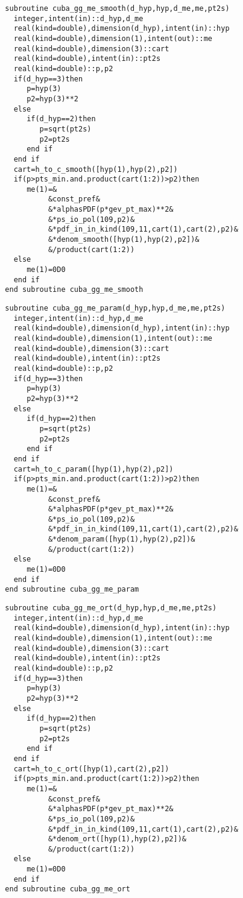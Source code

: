 \begin{Verbatim}
  subroutine cuba_gg_me_smooth(d_hyp,hyp,d_me,me,pt2s)
    integer,intent(in)::d_hyp,d_me
    real(kind=double),dimension(d_hyp),intent(in)::hyp
    real(kind=double),dimension(1),intent(out)::me
    real(kind=double),dimension(3)::cart
    real(kind=double),intent(in)::pt2s
    real(kind=double)::p,p2
    if(d_hyp==3)then
       p=hyp(3)
       p2=hyp(3)**2
    else
       if(d_hyp==2)then
          p=sqrt(pt2s)
          p2=pt2s
       end if
    end if
    cart=h_to_c_smooth([hyp(1),hyp(2),p2])
    if(p>pts_min.and.product(cart(1:2))>p2)then
       me(1)=&
            &const_pref&
            &*alphasPDF(p*gev_pt_max)**2&
            &*ps_io_pol(109,p2)&
            &*pdf_in_in_kind(109,11,cart(1),cart(2),p2)&
            &*denom_smooth([hyp(1),hyp(2),p2])&
            &/product(cart(1:2))
    else
       me(1)=0D0
    end if
  end subroutine cuba_gg_me_smooth
\end{Verbatim}

\begin{Verbatim}
  subroutine cuba_gg_me_param(d_hyp,hyp,d_me,me,pt2s)
    integer,intent(in)::d_hyp,d_me
    real(kind=double),dimension(d_hyp),intent(in)::hyp
    real(kind=double),dimension(1),intent(out)::me
    real(kind=double),dimension(3)::cart
    real(kind=double),intent(in)::pt2s
    real(kind=double)::p,p2
    if(d_hyp==3)then
       p=hyp(3)
       p2=hyp(3)**2
    else
       if(d_hyp==2)then
          p=sqrt(pt2s)
          p2=pt2s
       end if
    end if
    cart=h_to_c_param([hyp(1),hyp(2),p2])
    if(p>pts_min.and.product(cart(1:2))>p2)then
       me(1)=&
            &const_pref&
            &*alphasPDF(p*gev_pt_max)**2&
            &*ps_io_pol(109,p2)&
            &*pdf_in_in_kind(109,11,cart(1),cart(2),p2)&
            &*denom_param([hyp(1),hyp(2),p2])&
            &/product(cart(1:2))
    else
       me(1)=0D0
    end if
  end subroutine cuba_gg_me_param
\end{Verbatim}

\begin{Verbatim}
  subroutine cuba_gg_me_ort(d_hyp,hyp,d_me,me,pt2s)
    integer,intent(in)::d_hyp,d_me
    real(kind=double),dimension(d_hyp),intent(in)::hyp
    real(kind=double),dimension(1),intent(out)::me
    real(kind=double),dimension(3)::cart
    real(kind=double),intent(in)::pt2s
    real(kind=double)::p,p2
    if(d_hyp==3)then
       p=hyp(3)
       p2=hyp(3)**2
    else
       if(d_hyp==2)then
          p=sqrt(pt2s)
          p2=pt2s
       end if
    end if
    cart=h_to_c_ort([hyp(1),cart(2),p2])
    if(p>pts_min.and.product(cart(1:2))>p2)then
       me(1)=&
            &const_pref&
            &*alphasPDF(p*gev_pt_max)**2&
            &*ps_io_pol(109,p2)&
            &*pdf_in_in_kind(109,11,cart(1),cart(2),p2)&
            &*denom_ort([hyp(1),hyp(2),p2])&
            &/product(cart(1:2))
    else
       me(1)=0D0
    end if
  end subroutine cuba_gg_me_ort
\end{Verbatim}

